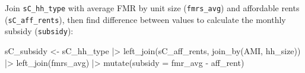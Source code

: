 \documentclass[
  10pt,
  letterpaper,
  DIV=11,
  numbers=noendperiod]{scrartcl}
\newenvironment{Shaded}{\begin{snugshade}}{\end{snugshade}}
\newcommand{\AttributeTok}[1]{\textcolor[rgb]{0.40,0.45,0.13}{#1}}
\newcommand{\FunctionTok}[1]{\textcolor[rgb]{0.28,0.35,0.67}{#1}}
\newcommand{\NormalTok}[1]{\textcolor[rgb]{0.00,0.23,0.31}{#1}}
\newcommand{\OtherTok}[1]{\textcolor[rgb]{0.00,0.23,0.31}{#1}}
\newcommand{\SpecialCharTok}[1]{\textcolor[rgb]{0.37,0.37,0.37}{#1}}
\begin{document}
\newpage

Join \texttt{sC\_hh\_type} with average FMR by unit size
(\texttt{fmrs\_avg}) and affordable rents (\texttt{sC\_aff\_rents}),
then find difference between values to calculate the monthly subsidy
(\texttt{subsidy}):

\begin{Shaded}
\begin{Highlighting}[]
\NormalTok{sC\_subsidy }\OtherTok{\textless{}{-}}\NormalTok{ sC\_hh\_type }\SpecialCharTok{|\textgreater{}} 
  \FunctionTok{left\_join}\NormalTok{(sC\_aff\_rents, }\FunctionTok{join\_by}\NormalTok{(AMI, hh\_size)) }\SpecialCharTok{|\textgreater{}} 
  \FunctionTok{left\_join}\NormalTok{(fmrs\_avg) }\SpecialCharTok{|\textgreater{}} 
  \FunctionTok{mutate}\NormalTok{(}\AttributeTok{subsidy =}\NormalTok{ fmr\_avg }\SpecialCharTok{{-}}\NormalTok{ aff\_rent)}
\end{Highlighting}
\end{Shaded}

\begingroup\fontsize{8}{10}\selectfont
\end{document}
